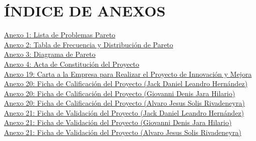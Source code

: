 \documentclass[12pt, a4paper]{report}
\begin{document}

\cleardoublepage

\setcounter{page}{2}


\cleardoublepage


\cleardoublepage

\tableofcontents %
\cleardoublepage

\listoffigures %
\cleardoublepage

\listoftables %
\cleardoublepage

\chapter*{\centering ÍNDICE DE ANEXOS}

\vspace{0.4em}
\noindent \hyperref[anexo1]{Anexo 1: Lista de Problemas Pareto \dotfill \pageref{anexo1}} \\
\noindent \hyperref[anexo2]{Anexo 2: Tabla de Frecuencia y Distribución de Pareto \dotfill \pageref{anexo2}} \\
\noindent \hyperref[anexo3]{Anexo 3: Diagrama de Pareto \dotfill \pageref{anexo3}} \\
\noindent \hyperref[anexo4]{Anexo 4: Acta de Constitución del Proyecto \dotfill \pageref{anexo4}} \\
\noindent \hyperref[anexo19]{Anexo 19: Carta a la Empresa para Realizar el Proyecto de Innovación y Mejora \dotfill \pageref{anexo19}} \\
\noindent \hyperref[anexo20_jack]{Anexo 20: Ficha de Calificación del Proyecto (Jack Daniel Leandro Hernández) \dotfill \pageref{anexo20_jack}} \\
\noindent \hyperref[anexo20_denis]{Anexo 20: Ficha de Calificación del Proyecto (Giovanni Denis Jara Hilario) \dotfill \pageref{anexo20_denis}} \\
\noindent \hyperref[anexo20_alvaro]{Anexo 20: Ficha de Calificación del Proyecto (Alvaro Jesus Solis Rivadeneyra) \dotfill \pageref{anexo20_alvaro}} \\
\noindent \hyperref[anexo21_jack]{Anexo 21: Ficha de Validación del Proyecto (Jack Daniel Leandro Hernández) \dotfill \pageref{anexo21_jack}} \\
\noindent \hyperref[anexo21_denis]{Anexo 21: Ficha de Validación del Proyecto (Giovanni Denis Jara Hilario) \dotfill \pageref{anexo21_denis}} \\
\noindent \hyperref[anexo21_alvaro]{Anexo 21: Ficha de Validación del Proyecto (Alvaro Jesus Solis Rivadeneyra) \dotfill \pageref{anexo21_alvaro}}
\end{document}
